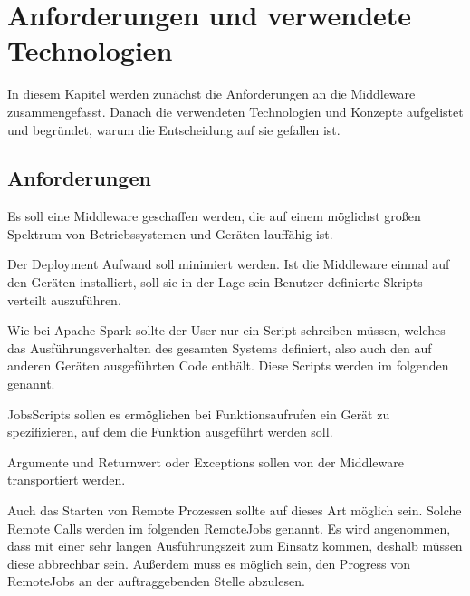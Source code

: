 
\chapter{Anforderungen und verwendete Technologien}
\label{K3}
In diesem Kapitel werden zunächst die Anforderungen an die Middleware zusammengefasst. Danach die verwendeten Technologien und Konzepte aufgelistet und begründet, warum die Entscheidung auf sie gefallen ist.



\section{Anforderungen}

\BCL
  \item Es soll eine Middleware geschaffen werden, die auf einem möglichst großen Spektrum von Betriebssystemen und Geräten lauffähig ist.

  \item Der Deployment Aufwand soll minimiert werden.
  Ist die Middleware einmal auf den Geräten installiert, soll sie in der Lage sein Benutzer definierte Skripts verteilt auszuführen.

  \item Wie bei Apache Spark sollte der User nur ein Script schreiben müssen, welches das Ausführungsverhalten des gesamten Systems definiert, also auch den auf anderen Geräten ausgeführten Code enthält.
  Diese Scripts werden im folgenden \jobScript{} genannt.

  \item JobsScripts sollen es ermöglichen bei Funktionsaufrufen ein Gerät zu spezifizieren, auf dem die Funktion ausgeführt werden soll.

  \item Argumente und Returnwert oder Exceptions sollen von der Middleware transportiert werden.

  \item Auch das Starten von Remote Prozessen sollte auf dieses Art möglich sein.
  Solche Remote Calls werden im folgenden RemoteJobs genannt.
  Es wird angenommen, dass \remoteJobs{} mit einer sehr langen Ausführungszeit zum Einsatz kommen, deshalb müssen diese abbrechbar sein.
  Außerdem muss es möglich sein, den Progress von RemoteJobs an der auftraggebenden Stelle abzulesen.
\ECL

